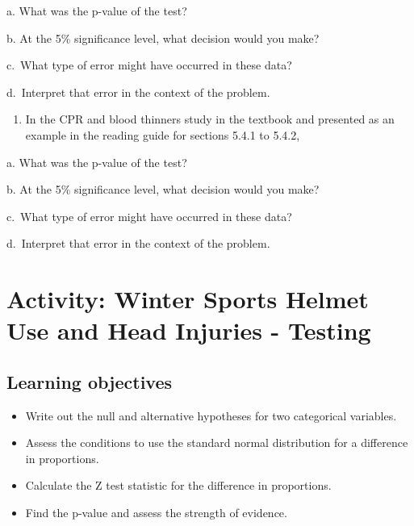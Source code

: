 \documentclass[
]{report}
\providecommand{\tightlist}{%
  \setlength{\itemsep}{0pt}\setlength{\parskip}{0pt}}
\newcommand{\rgs}{\vspace{12pt}} %
\newcommand{\rgi}{\hspace{24pt}}  %
\begin{document}
\rgi a. What was the p-value of the test?
\rgs

\rgi b. At the 5\% significance level, what decision would you make?
\rgs

\rgi c.~What type of error might have occurred in these data?
\rgs

\rgi d.~Interpret that error in the context of the problem.
\rgs
\rgs

\begin{enumerate}
\def\labelenumi{\arabic{enumi}.}
\setcounter{enumi}{2}
\tightlist
\item
  In the CPR and blood thinners study in the textbook and presented as an example in the reading guide for sections 5.4.1 to 5.4.2,
\end{enumerate}

\rgi a. What was the p-value of the test?
\rgs

\rgi b. At the 5\% significance level, what decision would you make?
\rgs

\rgi c.~What type of error might have occurred in these data?
\rgs

\rgi d.~Interpret that error in the context of the problem.
\rgs
\rgs

\newpage

\hypertarget{activity-winter-sports-helmet-use-and-head-injuries---testing}{%
\section{Activity: Winter Sports Helmet Use and Head Injuries - Testing}\label{activity-winter-sports-helmet-use-and-head-injuries---testing}}


\hypertarget{learning-objectives-4}{%
\subsection{Learning objectives}\label{learning-objectives-4}}

\begin{itemize}
\item
  Write out the null and alternative hypotheses for two categorical variables.
\item
  Assess the conditions to use the standard normal distribution for a difference in proportions.
\item
  Calculate the Z test statistic for the difference in proportions.
\item
  Find the p-value and assess the strength of evidence.
\end{itemize}
\end{document}
